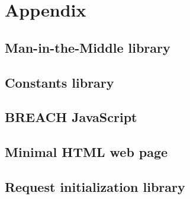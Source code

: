 \chapter{Appendix}\label{ch:appendix}

\section{Man-in-the-Middle library}\label{sec:connect_py}


\section{Constants library}\label{sec:constants_py}


\section{BREACH JavaScript}\label{sec:evil_js}


\section{Minimal HTML web page}\label{sec:index_html}


\section{Request initialization library}\label{sec:hillclimbing_py}

